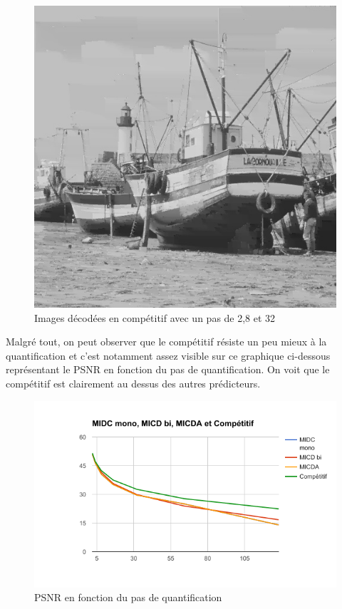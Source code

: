 \documentclass[12pt]{report}
\begin{document}
\begin{figure}[H]
\begin{center}
\includegraphics[scale=0.25]{../ImageRes/ImagedecodeeCompetitifQ32.jpg} 
\caption{Images décodées en compétitif avec un pas de 2,8 et 32 }
\end{center}
\end{figure}

Malgré tout, on peut observer que le compétitif résiste un peu mieux à la quantification et c'est notamment assez visible sur ce graphique ci-dessous représentant le PSNR en fonction du pas de quantification. On voit que le compétitif est clairement au dessus des autres prédicteurs.

\begin{figure}[H]
\begin{center}
\includegraphics[scale=0.8]{../ImageRes/PSNR.png} 
\caption{PSNR en fonction du pas de quantification}
\end{center}
\end{figure}
\end{document}
